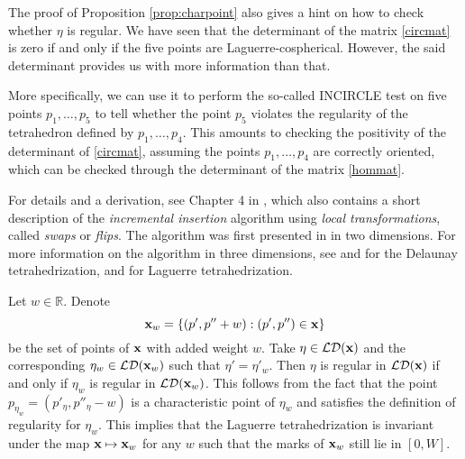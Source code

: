 \begin{remark}\label{r:construct}
	The proof of Proposition \ref{prop:charpoint} also gives a hint on how to check whether $\eta$ is regular. We have seen that the determinant of the matrix \eqref{circmat} is zero if and only if the five points are Laguerre-cospherical. However, the said determinant provides us with more information than that. 
	
	More specifically, we can use it to perform the so-called INCIRCLE test on five points $p_1,\dots, p_5$ to tell whether the point $p_5$ violates the regularity of the tetrahedron defined by $p_1,\dots, p_4$. This amounts to checking the positivity of the determinant of \eqref{circmat}, assuming the points $p_1,\dots, p_4$ are correctly oriented, which can be checked through the determinant of the matrix \eqref{hommat}. 
	
	For details and a derivation, see Chapter 4 in \cite{Gavrilova}, which also contains a short description of the \textit{incremental insertion} algorithm using \textit{local transformations}, called \textit{swaps} or \textit{flips}. The algorithm was first presented in \cite{Lawson72} in two dimensions. For more information on the algorithm in three dimensions, see \cite{Joe89} and \cite{Joe91} for the Delaunay tetrahedrization, and \cite{Edelsbrunner1996} for Laguerre tetrahedrization.
\end{remark}



\begin{remark}\label{rem:invariance}
	Let $w\in \mathbb R$. Denote 
	$${\mathbf{x}}_w = \{(p',p''+w): (p',p'')\in{\mathbf{x}}\}$$ be the set of points of ${\mathbf{x}}$ with added weight $w$. Take $\eta \in \mathcal {LD}({\mathbf{x}})$ and the corresponding $\eta_w \in \mathcal {LD}({\mathbf{x}}_w)$ such that $\eta'= \eta'_w$. Then $\eta$ is regular in $\mathcal {LD}({\mathbf{x}})$ if and only if $\eta_w$ is  regular in $\mathcal {LD}({\mathbf{x}}_w)$. This follows from the fact that the point $p_{\eta_w} = (p'_{\eta}, p''_{\eta} -w)$ is a characteristic point of $\eta_w$ and satisfies the definition of regularity for $\eta_w$. This implies that the Laguerre tetrahedrization is invariant under the map ${\mathbf{x}} \mapsto {\mathbf{x}}_w$ for any $w$ such that the marks of ${\mathbf{x}}_w$ still lie in $[0,W]$.
\end{remark}

